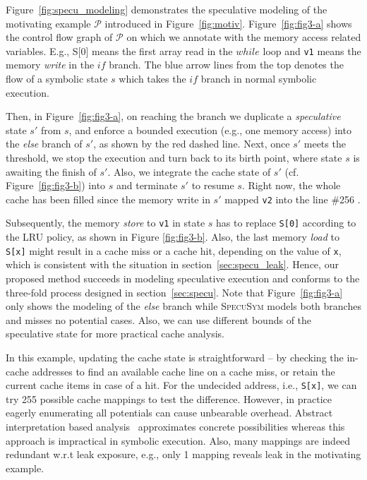 \documentclass[sigconf, review]{acmart}
\newcommand\ignore[1]{}
\newcommand{\SpecuSym}{\textsc{SpecuSym} }
\newcommand{\prog}{\mathcal{P}}
\begin{document}
Figure~\ref{fig:specu_modeling} demonstrates the speculative modeling of 
the motivating example $\prog$ introduced in Figure~\ref{fig:motiv}. 
Figure~\ref{fig:fig3-a} shows the control flow graph of $\prog$ on which 
we annotate with the memory access related variables. E.g., {S[0]} means 
the first array read in the $\mathit{while}$ loop and \texttt{v1} means 
the memory \emph{write} in the $\mathit{if}$ branch. The blue arrow lines 
from the top denotes the flow of a symbolic state $s$ which takes the 
$\mathit{if}$ branch in normal symbolic execution. 


Then, in Figure~\ref{fig:fig3-a}, on reaching the branch we duplicate a 
\textit{speculative} state $s'$ from $s$, and enforce a bounded execution
(e.g., one memory access) into the \textit{else} branch of $s'$, as shown 
by the red dashed line. Next, once $s'$ meets the threshold, we stop the 
execution and turn back to its birth point, where state $s$ is awaiting 
the finish of $s'$. Also, we integrate the cache state of $s'$ (cf. 
Figure~\ref{fig:fig3-b}) into $s$ and terminate $s'$ to resume $s$. Right 
now, the whole cache has been filled since the memory write in $s'$ mapped 
\texttt{v2} into the line \#256 . 


Subsequently, the memory \emph{store} to \texttt{v1} in state $s$ has to 
replace \texttt{S[0]} according to the LRU policy, as shown in Figure
\ref{fig:fig3-b}. Also, the last memory \emph{load} to \texttt{S[x]} might 
result in a cache miss or a cache hit, depending on the value of \texttt{x}, 
which is consistent with the situation in section~\ref{sec:specu_leak}. 
Hence, our proposed method succeeds in modeling speculative execution 
and conforms to the three-fold process designed in section~\ref{sec:specu}. 
Note that Figure~\ref{fig:fig3-a} only shows the modeling of the \emph{else} 
branch while \SpecuSym models both branches and misses no potential cases. 
Also, we can use different bounds of the speculative state for more practical 
cache analysis.


\ignore{
In Figure~\ref{fig:fig3-a}, the speculative state $s'$ inherits the cache 
state from $s$, maps \texttt{v2} into a cache line, and merges back the updated 
cache state to state $s$ before its termination, as formally stated in Algorithm
\ref{alg:specusym} (lines 24-26). 
}


In this example, updating the cache state is straightforward -- by checking 
the in-cache addresses to find an available cache line on a cache miss, or 
retain the current cache items in case of a hit. For the undecided address, 
i.e., \texttt{S[x]}, we can try 255 possible cache mappings to test the 
difference. However, in practice eagerly enumerating all potentials can 
cause unbearable overhead. Abstract interpretation based analysis~\cite{WuW19} 
approximates concrete possibilities whereas this approach is impractical in 
symbolic execution. Also, many mappings are indeed redundant w.r.t leak 
exposure, e.g., only 1 mapping reveals leak in the motivating example. 
\end{document}
